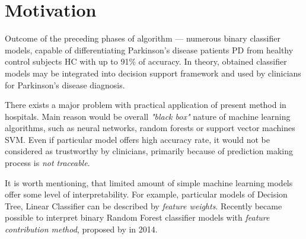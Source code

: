 \begin{comment}



\end{comment}

\section{Motivation}

Outcome of the preceding phases of algorithm --- numerous binary classifier models, capable of differentiating Parkinson's disease patients PD from healthy control subjects HC with up to 91\% of accuracy. In theory, obtained classifier models may be integrated into decision support framework and used by clinicians for Parkinson's disease diagnosis.

There exists a major problem with practical application of present method in hospitals. Main reason would be overall \textit{"black box"} nature of machine learning algorithms, such as neural networks, random forests or support vector machines SVM. Even if particular model offers high accuracy rate, it would not be considered as trustworthy by clinicians, primarily because of prediction making process is \textit{not traceable}. 

It is worth mentioning, that limited amount of simple machine learning models offer some level of interpretability. For example, particular models of Decision Tree, Linear Classifier can be described by \textit{feature weights}. Recently became possible to interpret binary Random Forest classifier models with \textit{feature contribution method}, proposed by \citet*{palczewska2014interpreting} in 2014. 


